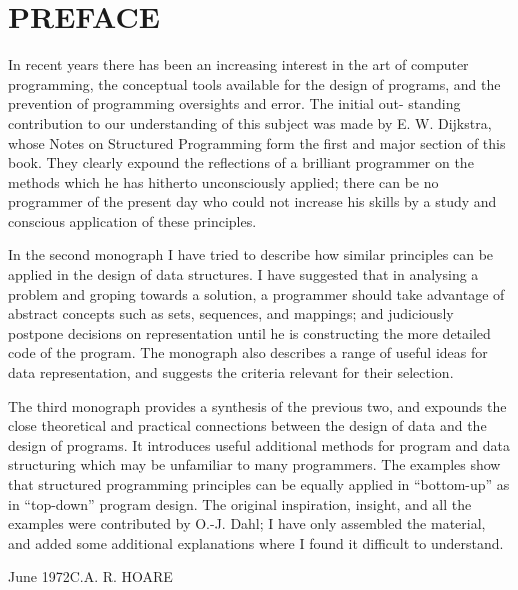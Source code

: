 \chapter*{PREFACE}

In recent years there has been an increasing interest in the art of computer programming, the conceptual tools available for the design of programs, and the prevention of programming oversights and error. The initial out- standing contribution to our understanding of this subject was made by E. W. Dijkstra, whose Notes on Structured Programming form the first and major section of this book. They clearly expound the reflections of a brilliant programmer on the methods which he has hitherto unconsciously applied; there can be no programmer of the present day who could not increase his skills by a study and conscious application of these principles.

In the second monograph I have tried to describe how similar principles can be applied in the design of data structures. I have suggested that in analysing a problem and groping towards a solution, a programmer should take advantage of abstract concepts such as sets, sequences, and mappings; and judiciously postpone decisions on representation until he is constructing the more detailed code of the program. The monograph also describes a range of useful ideas for data representation, and suggests the criteria relevant for their selection.

The third monograph provides a synthesis of the previous two, and expounds the close theoretical and practical connections between the design of data and the design of programs. It introduces useful additional methods for program and data structuring which may be unfamiliar to many programmers. The examples show that structured programming principles can be equally applied in ``bottom-up'' as in ``top-down'' program design. The original inspiration, insight, and all the examples were contributed by O.-J. Dahl; I have only assembled the material, and added some additional explanations where I found it difficult to understand.
\bigskip
 
\noindent
June 1972\hfill C.A. R. HOARE

